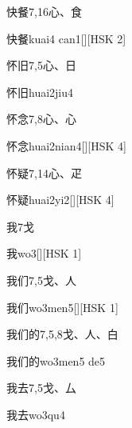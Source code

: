 \begin{entry}{快餐}{7,16}{⼼、⾷}
  \begin{phonetics}{快餐}{kuai4 can1}[][HSK 2]
  \end{phonetics}
\end{entry}

\begin{entry}{怀旧}{7,5}{⼼、⽇}
  \begin{phonetics}{怀旧}{huai2jiu4}
  \end{phonetics}
\end{entry}

\begin{entry}{怀念}{7,8}{⼼、⼼}
  \begin{phonetics}{怀念}{huai2nian4}[][HSK 4]
  \end{phonetics}
\end{entry}

\begin{entry}{怀疑}{7,14}{⼼、⽦}
  \begin{phonetics}{怀疑}{huai2yi2}[][HSK 4]
  \end{phonetics}
\end{entry}

\begin{entry}{我}{7}{⼽}
  \begin{phonetics}{我}{wo3}[][HSK 1]
  \end{phonetics}
\end{entry}

\begin{entry}{我们}{7,5}{⼽、⼈}
  \begin{phonetics}{我们}{wo3men5}[][HSK 1]
  \end{phonetics}
\end{entry}

\begin{entry}{我们的}{7,5,8}{⼽、⼈、⽩}
  \begin{phonetics}{我们的}{wo3men5 de5}
  \end{phonetics}
\end{entry}

\begin{entry}{我去}{7,5}{⼽、⼛}
  \begin{phonetics}{我去}{wo3qu4}
  \end{phonetics}
\end{entry}

